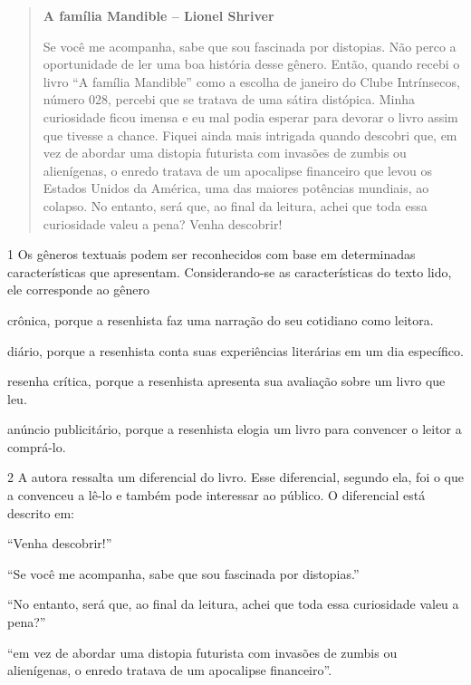 \begin{quote}
\textbf{A família Mandible -- Lionel Shriver}

Se você me acompanha, sabe que sou fascinada por distopias. Não perco a
oportunidade de ler uma boa história desse gênero. Então, quando recebi
o livro ``A família Mandible'' como a escolha de janeiro do Clube
Intrínsecos, número 028, percebi que se tratava de uma sátira distópica.
Minha curiosidade ficou imensa e eu mal podia esperar para devorar o
livro assim que tivesse a chance. Fiquei ainda mais intrigada quando
descobri que, em vez de abordar uma distopia futurista com invasões de
zumbis ou alienígenas, o enredo tratava de um apocalipse financeiro que
levou os Estados Unidos da América, uma das maiores potências mundiais,
ao colapso. No entanto, será que, ao final da leitura, achei que toda
essa curiosidade valeu a pena? Venha descobrir!

\end{quote}

\num{1} Os gêneros textuais podem ser reconhecidos com base em
determinadas características que apresentam. Considerando-se as
características do texto lido, ele corresponde ao gênero

\begin{escolha}
\item
  crônica, porque a resenhista faz uma narração do seu cotidiano como
  leitora.
\item
  diário, porque a resenhista conta suas experiências literárias em um
  dia específico.
\item
  resenha crítica, porque a resenhista apresenta sua avaliação sobre um
  livro que leu.
\item
  anúncio publicitário, porque a resenhista elogia um livro para
  convencer o leitor a comprá-lo.
\end{escolha}

\num{2} A autora ressalta um diferencial do livro. Esse diferencial,
segundo ela, foi o que a convenceu a lê-lo e também pode interessar ao
público. O diferencial está descrito em:

\begin{escolha}
\item ``Venha descobrir!''

\item ``Se você me acompanha, sabe que sou fascinada por distopias.''

\item ``No entanto, será que, ao final da leitura, achei que toda essa
curiosidade valeu a pena?''

\item ``em vez de abordar uma distopia futurista com invasões de zumbis ou
alienígenas, o enredo tratava de um apocalipse financeiro''.
\end{escolha}

